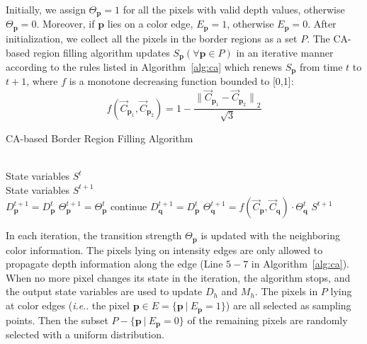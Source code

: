 \documentclass[preprint,10pt,5p,times,twocolumn]{elsarticle}
\makeatletter
\DeclareRobustCommand\onedot{\futurelet\@let@token\@onedot}
\def\@onedot{\ifx\@let@token.\else.\null\fi\xspace}
\def\ie{\emph{i.e}\onedot} \def\Ie{\emph{I.e}\onedot}
\makeatother
\begin{document}
Initially, we assign $\Theta_{\mathbf{p}}=1$ for all the pixels with valid depth values, otherwise $\Theta_{\mathbf{p}}=0$. Moreover, if $\mathbf{p}$ lies on a color edge, $E_{\mathbf{p}}=1$, otherwise $E_{\mathbf{p}}=0$. After initialization, we collect all the pixels in the border regions as a set $P$. The CA-based region filling algorithm updates $S_{\mathbf{p}}(\forall \mathbf{p}\in P)$ in an iterative manner according to the rules listed in Algorithm~\ref{alg:ca} which renews $S_{\mathbf{p}}$ from time $t$ to $t+1$, where $f$ is a monotone decreasing function bounded to [0,1]:
%
\begin{equation}
\label{eq:f}
f(\overrightarrow{C}_{\mathbf{p}_1},\overrightarrow{C}_{\mathbf{p}_2})=1-\frac{{\|\overrightarrow{C}_{\mathbf{p}_1}-\overrightarrow{C}_{\mathbf{p}_2}\|}_{2}}{\sqrt{3}}
\end{equation}


\begin{algorithm}[tb] %
\renewcommand{\algorithmicrequire}{\textbf{Input:}}
\renewcommand\algorithmicensure {\textbf{Output:} }
\caption{CA-based Border Region Filling Algorithm} %
\label{alg:ca} %
\begin{algorithmic}[1] %
\REQUIRE ~~\\ %
State variables $S^t$
\ENSURE ~~\\ %
State variables $S^{t+1}$\\
    \STATE $D_{\mathbf{p}}^{t+1}=D_{\mathbf{p}}^{t}$
    \STATE $\Theta_{\mathbf{p}}^{t+1}=\Theta_{\mathbf{p}}^{t}$
            \STATE continue
            \ENDIF
                \STATE $D_{\mathbf{q}}^{t+1}=D_{\mathbf{p}}^{t}$
                \STATE $\Theta_\mathbf{q}^{t+1}=f(\overrightarrow{C}_{\mathbf{p}},\overrightarrow{C}_{\mathbf{q}})\cdot \Theta^t_{\mathbf{q}}$
            \ENDIF
    \ENDFOR
\ENDFOR
\RETURN $S^{t+1}$ %
\end{algorithmic}
\end{algorithm}


In each iteration, the transition strength $\Theta_{\mathbf{p}}$ is updated with the neighboring color information. The pixels lying on intensity edges are only allowed to propagate depth information along the edge (Line $5-7$ in Algorithm~\ref{alg:ca}). When no more pixel changes its state in the iteration, the algorithm stops, and the output state variables are used to update $D_{h}$ and $M_{h}$. The pixels in $P$ lying at color edges (\ie the pixel $ \mathbf{p} \in E = \{\mathbf{p} \ | \ E_{\mathbf{p}}=1 \}$) are all selected as sampling points. Then the subset $P - \{\mathbf{p} \ | \ E_{\mathbf{p}}=0 \}$ of the remaining pixels are randomly selected with a uniform distribution.
\end{document}
